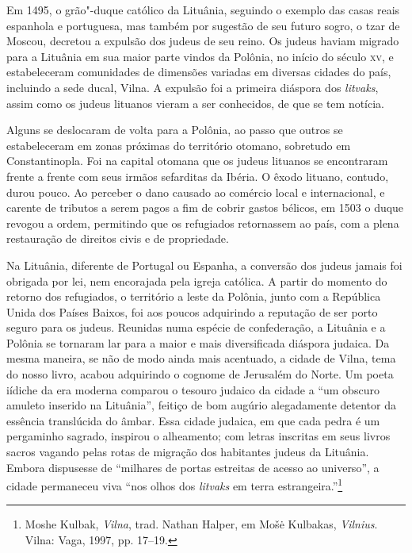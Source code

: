 Em 1495, o grão"-duque católico da Lituânia, seguindo o exemplo das casas
reais espanhola e portuguesa, mas também por sugestão de seu futuro
sogro, o tzar de Moscou, decretou a expulsão dos judeus de seu reino. Os
judeus haviam migrado para a Lituânia em sua maior parte vindos da
Polônia, no início do século \textsc{xv}, e estabeleceram comunidades de
dimensões variadas em diversas cidades do país, incluindo a sede ducal,
Vilna. A expulsão foi a primeira diáspora dos \textit{litvaks}, assim como os
judeus lituanos vieram a ser conhecidos, de que se tem notícia. 

Alguns
se deslocaram de volta para a Polônia, ao passo que outros se
estabeleceram em zonas próximas do território otomano, sobretudo em
Constantinopla. Foi na capital otomana que os judeus lituanos se
encontraram frente a frente com seus irmãos sefarditas da Ibéria. O
êxodo lituano, contudo, durou pouco. Ao perceber o dano causado ao
comércio local e internacional, e carente de tributos a serem pagos a
fim de cobrir gastos bélicos, em 1503 o duque revogou a ordem,
permitindo que os refugiados retornassem ao país, com a plena
restauração de direitos civis e de propriedade. 

Na Lituânia, diferente
de Portugal ou Espanha, a conversão dos judeus jamais foi obrigada por
lei, nem encorajada pela igreja católica. A partir do momento do retorno
dos refugiados, o território a leste da Polônia, junto com a República
Unida dos Países Baixos, foi aos poucos adquirindo a reputação de ser
porto seguro para os judeus. Reunidas numa espécie de confederação, a
Lituânia e a Polônia se tornaram lar para a maior e mais diversificada
diáspora judaica. Da mesma maneira, se não de modo ainda mais acentuado,
a cidade de Vilna, tema do nosso livro, acabou adquirindo o cognome de
Jerusalém do Norte. Um poeta iídiche da era moderna comparou o tesouro
judaico da cidade a ``um obscuro amuleto inserido na Lituânia'', feitiço
de bom augúrio alegadamente detentor da essência translúcida do âmbar.
Essa cidade judaica, em que cada pedra é um pergaminho sagrado, inspirou
o alheamento; com letras inscritas em seus livros sacros vagando pelas
rotas de migração dos habitantes judeus da Lituânia. Embora dispusesse
de ``milhares de portas estreitas de acesso ao universo'', a cidade
permaneceu viva ``nos olhos dos \textit{litvaks} em terra
estrangeira.''\footnote{Moshe Kulbak, \textit{Vilna}, trad. Nathan
  Halper, em Mošė Kulbakas, \textit{Vilnius}. Vilna: Vaga, 1997, pp.
  17--19.}

